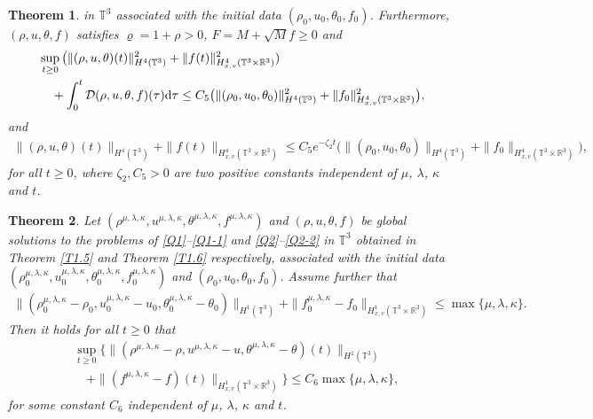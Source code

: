 \documentclass[reqno,11pt]{amsart}
\theoremstyle{plain}
\newtheorem{thm}{Theorem}[section]
\numberwithin{equation}{section}
\begin{document}
\begin{thm}
  in $\mathbb{T}^3 $ associated with the initial data $(\rho_0,u_0,\theta_0,f_0)$. 
  Furthermore, $(\rho,u,\theta,f)$ satisfies $\varrho=1+\rho>0$,
 $F=M+\sqrt{M}f \geq 0$ and
 \begin{align*} 
&\sup_{t\geq 0}\big(\|(\rho,u,\theta)(t)\|_{H^{4}(\mathbb{T}^3)}^2
+\|f(t)\|_{H_{x,v}^4(\mathbb{T}^3\times\mathbb{R}^3)}^2)
\nonumber\\
&\quad  +\int_{0}^{t}\mathcal{D}(\rho,u,\theta,f)(\tau){\rm d}\tau
\leq C_5\big(\|(\rho_{0},u_{0},\theta_{0})\|_{H^{4}(\mathbb{T}^3)}^2
 +\|f_0\|_{H_{x,v}^4(\mathbb{T}^3\times\mathbb{R}^3)}^2\big),
\end{align*}
and
\begin{gather*}
\|(\rho,u,\theta)(t)\|_{H^4(\mathbb{T}^3) }+\|f(t)\|_{H^4_{x,v}(\mathbb{T}^3\times\mathbb{R}^3) }
\leq C_5e^{-\zeta_2 t}\big(\|(\rho_0,u_0,\theta_0)\|_{H^4(\mathbb{T}^3)} 
+\|f_0\|_{H^4_{x,v}(\mathbb{T}^3\times\mathbb{R}^3)} \big),
\end{gather*}
for all $t\geq 0$, where $\zeta_2,C_5> 0$ are two positive constants 
 independent of $\mu$, $\lambda$, $\kappa$ and $t$.
\end{thm}


\begin{thm}\label{T1.7}
Let $(\rho^{\mu,\lambda,\kappa},u^{\mu,\lambda,\kappa},\theta^{\mu,\lambda,\kappa},
f^{\mu,\lambda,\kappa})$ and $(\rho,u,\theta,f)$ be  global solutions to the 
 problems of \eqref{Q1}--\eqref{Q1-1} and \eqref{Q2}--\eqref{Q2-2}  in $\mathbb{T}^3 $ 
 obtained in Theorem \ref{T1.5} and Theorem \ref{T1.6}  respectively, associated with the initial data 
  $(\rho_0^{\mu,\lambda,\kappa},u_0^{\mu,\lambda,\kappa},\theta_0^{\mu,\lambda,\kappa},
  f_0^{\mu,\lambda,\kappa})$ 
and $(\rho_0,u_0,\theta_0,f_0)$. Assume further that 
\begin{align*}
\|(\rho_0^{\mu,\lambda,\kappa}-\rho_0,u_0^{\mu,\lambda,\kappa}-u_0,
\theta_0^{\mu,\lambda,\kappa}-\theta_0)\|_{H^1(\mathbb{T}^3)}+\|f_0^{\mu,\lambda,\kappa}
-f_0\|_{H_{x,v}^1(\mathbb{T}^3\times\mathbb{R}^3)}\leq \max\{\mu,\lambda,\kappa\} .
\end{align*}
Then it holds for all $t\geq0$ that
\begin{align*} 
& \sup_{t\geq 0}\big\{\|(\rho^{\mu,\lambda,\kappa}-\rho,u^{\mu,\lambda,
\kappa}-u,\theta^{\mu,\lambda,\kappa}-\theta)(t)\|_{H^1(\mathbb{T}^3)}\nonumber\\
&\quad +\|(f^{\mu,\lambda,\kappa}
-f)(t)\|_{H_{x,v}^1(\mathbb{T}^3\times\mathbb{R}^3)}\big\}\leq C_6 \max\{\mu,\lambda,\kappa\},
\end{align*}
for some constant $C_6$ independent of $\mu$, $\lambda$, $\kappa$ and   $t$. 
\end{thm}
\end{document}
